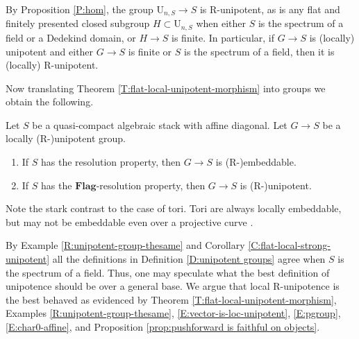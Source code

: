 \documentclass[reqno,a4paper]{amsart}
\numberwithin{Theorem}{section}
\renewcommand{\U}{\mathrm{U}}
\newcommand{\Flag}{\mathbf{Flag}}
\theoremstyle{plain}
\theoremstyle{remark}
\begin{document}
  
\begin{Example}\label{R:unipotent-group-thesame}
  By Proposition \ref{P:hom}, the group $\U_{n,S} \to S$ is
  R-unipotent, as is any flat and finitely presented closed
  subgroup $H \subset \U_{n,S}$ when either $S$ is the spectrum of a field or a Dedekind domain, or $H \to S$ is finite. In particular, if $G \to S$ is (locally) unipotent and
  either $G \to S$ is finite or $S$ is the spectrum of a field, then
  it is (locally) R-unipotent.
\end{Example}
  



Now translating Theorem \ref{T:flat-local-unipotent-morphism} into groups
we obtain the following.
\begin{corollary}\label{C:flat-local-strong-unipotent}
  Let $S$ be a quasi-compact algebraic stack with affine diagonal. Let $G \to S$ be a locally (R-)unipotent group.
  \begin{enumerate}
  \item If $S$ has the resolution property, then $G \to S$ is (R-)embeddable.
  \item If $S$ has the $\Flag$-resolution property, then $G \to S$ is
    (R-)unipotent.
  \end{enumerate}
\end{corollary}
Note the stark contrast to the case of
tori. Tori are always locally embeddable, but may not be embeddable even over a projective curve
\cite[X.1.6 \& XI.4.6]{SGA3-II-NEW}.

\begin{remark} \label{rem:overafieldallagree} By Example \ref{R:unipotent-group-thesame} and Corollary \ref{C:flat-local-strong-unipotent} all the definitions in Definition \ref{D:unipotent groups} agree when $S$ is the spectrum of a field. Thus, one may speculate what the best definition of unipotence should be over a general base. We argue that local R-unipotence is the best behaved as evidenced by Theorem \ref{T:flat-local-unipotent-morphism}, Examples \ref{R:unipotent-group-thesame}, \ref{E:vector-is-loc-unipotent}, \ref{E:pgroup}, \ref{E:char0-affine}, and Proposition \ref{prop:pushforward is faithful on objects}. \end{remark}
\end{document}
